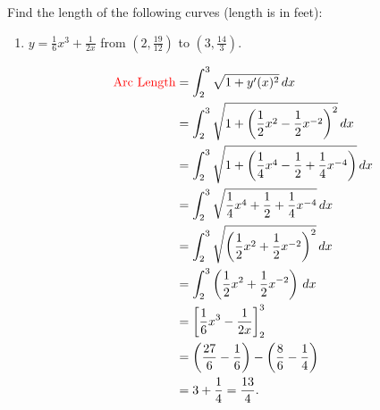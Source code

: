 \documentclass[noinstructornotes]{ximera}
\begin{document}
\begin{problem}
Find the length of the following curves (length is in feet):
	\begin{enumerate}
		\item  $y = \frac{1}{6} x^3 + \frac{1}{2x}$ from $\left( 2, \frac{19}{12} \right)$ to $\left( 3, \frac{14}{3} \right)$.  
		\begin{freeResponse}
			\begin{align*}
			\text{{\color{red} Arc Length}} &= \int_2^3 \sqrt{1+y'(x)^2} \,d x  \\
			&= \int_2^3 \sqrt{1+ \left( \frac{1}{2}x^2 - \frac{1}{2}x^{-2} \right)^2} \,d x  \\
			&= \int_2^3 \sqrt{1+ \left( \frac{1}{4}x^4 - \frac{1}{2} + \frac{1}{4}x^{-4} \right)} \,d x  \\
			&= \int_2^3 \sqrt{\frac{1}{4}x^4 + \frac{1}{2} + \frac{1}{4}x^{-4}} \,d x  \\
			&= \int_2^3 \sqrt{\left( \frac{1}{2}x^2 + \frac{1}{2}x^{-2} \right)^2} \,d x  \\
			&= \int_2^3 \left( \frac{1}{2}x^2 + \frac{1}{2}x^{-2} \right) \,d x  \\
			&= \bigg[ \frac{1}{6}x^3 - \frac{1}{2x} \bigg]_2^3  \\
			&= \left( \frac{27}{6} - \frac{1}{6} \right) - \left( \frac{8}{6} - \frac{1}{4} \right)  \\
			&= 3 + \frac{1}{4} = \frac{13}{4}.
			\end{align*}
		\end{freeResponse}
		
		
		

\end{enumerate}
\end{problem}
\end{document}
